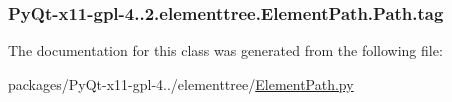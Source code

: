 \subsubsection[{tag}]{\setlength{\rightskip}{0pt plus 5cm}Py\+Qt-\/x11-\/gpl-\/4..\+2.elementtree.\+Element\+Path.\+Path.\+tag}\label{classPyQt-x11-gpl-4_811_82_1_1elementtree_1_1ElementPath_1_1Path_aa649f795b3586eec8230aa36872f5959}


The documentation for this class was generated from the following file\+:\begin{DoxyCompactItemize}
\item 
packages/\+Py\+Qt-\/x11-\/gpl-\/4../elementtree/\hyperlink{ElementPath_8py}{Element\+Path.\+py}\end{DoxyCompactItemize}

